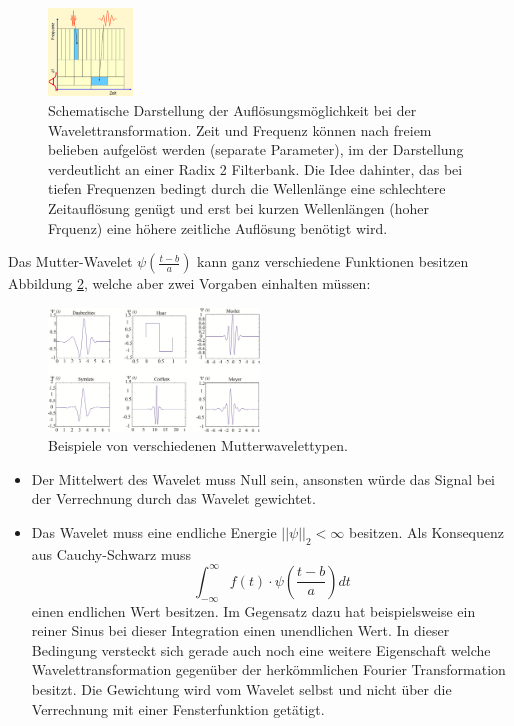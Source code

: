 \begin{figure}
	\centering
	\includegraphics[width=0.2\textwidth]{papers/wavelets/images/6-3_CWTAufloesungRadix2.png}
	\caption{Schematische Darstellung der Auflösungsmöglichkeit bei der Wavelettransformation. Zeit und Frequenz können nach freiem belieben aufgelöst werden (separate Parameter), im der Darstellung verdeutlicht an einer Radix 2 Filterbank. Die Idee dahinter, das bei tiefen Frequenzen bedingt durch die Wellenlänge eine schlechtere Zeitauflösung genügt und erst bei kurzen Wellenlängen (hoher Frquenz) eine höhere zeitliche Auflösung benötigt wird.}
	\label{wavelet:fig:CWTAufloesungRadix2}
\end{figure}

Das Mutter-Wavelet $\psi\left(\frac{t-b}{a}\right)$ kann ganz verschiedene Funktionen besitzen Abbildung \ref{wavelet:fig:MutterwavletTypen}, welche aber zwei Vorgaben einhalten müssen:

\begin{figure}
	\centering
	\includegraphics[width=0.5\textwidth]{papers/wavelets/images/6-4_MutterwavletTypen.png}
	\caption{Beispiele von verschiedenen Mutterwavelettypen.}
	\label{wavelet:fig:MutterwavletTypen}
\end{figure}

\begin{itemize}
	\item Der Mittelwert des Wavelet muss Null sein, ansonsten würde das Signal bei der Verrechnung durch das Wavelet gewichtet.
	\item Das Wavelet muss eine endliche Energie $||\psi||_2<\infty$ besitzen. Als Konsequenz aus Cauchy-Schwarz muss \[\int_{-\infty}^{\infty} f(t)\cdot\psi\left(\frac{t-b}{a}\right) dt\] einen endlichen Wert besitzen. Im Gegensatz dazu hat beispielsweise ein reiner Sinus bei dieser Integration einen unendlichen Wert. In dieser Bedingung versteckt sich gerade auch noch eine weitere Eigenschaft welche Wavelettransformation gegenüber der herkömmlichen Fourier Transformation besitzt. Die Gewichtung wird vom Wavelet selbst und nicht über die Verrechnung mit einer Fensterfunktion getätigt.
\end{itemize}













